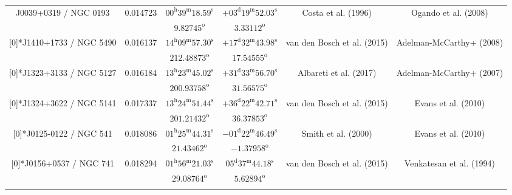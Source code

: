 \begin{landscape}
\begin{longtable}{cccccc}
 \multirow{2}[0]{*}{J0039+0319 / NGC 0193} & \multirow{2}[0]{*}{0.014723} &  
    $00^\text{h}39^\text{m}18.59^\text{s}$  & $+03^\text{d}19^\text{m}52.03^\text{s}$  & 
    \multirow{2}[0]{*}{Costa et al. (1996)\cite{CoordRef72_1996}}& \multirow{2}[0]{*}{Ogando et al. (2008) \cite{RedRef35_2008}} \\*
    & & $9.82745^\text{o}$ & $3.33112^\text{o}$ & & \\ \addlinespace 
 \multirow{2}[0]{*}{J1410+1733 / NGC 5490} & \multirow{2}[0]{*}{0.016137} &  
    $14^\text{h}09^\text{m}57.30^\text{s}$  & $+17^\text{d}32^\text{m}43.98^\text{s}$  & 
    \multirow{2}[0]{*}{van den Bosch et al. (2015)\cite{RedRef90_2015}}& \multirow{2}[0]{*}{Adelman-McCarthy+ (2008) \cite{CoordRef28_2008}} \\*
    & & $212.48873^\text{o}$ & $17.54555^\text{o}$ & & \\ \addlinespace 
 \multirow{2}[0]{*}{J1323+3133 / NGC 5127} & \multirow{2}[0]{*}{0.016184} &  
    $13^\text{h}23^\text{m}45.02^\text{s}$  & $+31^\text{d}33^\text{m}56.70^\text{s}$  & 
     \multirow{2}[0]{*}{Albareti et al. (2017)\cite{RedRef9_2017}}& \multirow{2}[0]{*}{Adelman-McCarthy+ (2007) \cite{CoordRef91_2007}} \\*
    & & $200.93758^\text{o}$ & $31.56575^\text{o}$ & & \\ \addlinespace 
  \multirow{2}[0]{*}{J1324+3622 / NGC 5141} & \multirow{2}[0]{*}{0.017337} &  
    $13^\text{h}24^\text{m}51.44^\text{s}$  & $+36^\text{d}22^\text{m}42.71^\text{s}$  & 
    \multirow{2}[0]{*}{van den Bosch et al. (2015)\cite{RedRef90_2015}}& \multirow{2}[0]{*}{Evans et al. (2010) \cite{CoordRef1_2010}} \\*
    & & $201.21432^\text{o}$ & $36.37853^\text{o}$ & & \\ \addlinespace 
  \multirow{2}[0]{*}{J0125-0122 / NGC 541} & \multirow{2}[0]{*}{0.018086} &  
    $01^\text{h}25^\text{m}44.31^\text{s}$  & $-01^\text{d}22^\text{m}46.49^\text{s}$  & 
    \multirow{2}[0]{*}{Smith et al. (2000)\cite{RedRef52_2000}}& \multirow{2}[0]{*}{Evans et al. (2010) \cite{CoordRef1_2010}} \\*
     & & $21.43462^\text{o}$ & $-1.37958^\text{o}$ & & \\ \addlinespace 

  \multirow{2}[0]{*}{J0156+0537 / NGC 741} & \multirow{2}[0]{*}{0.018294} &  
    $01^\text{h}56^\text{m}21.03^\text{s}$  & $05^\text{d}37^\text{m}44.18^\text{s}$  & 
    \multirow{2}[0]{*}{van den Bosch et al. (2015)\cite{RedRef90_2015}}& \multirow{2}[0]{*}{Venkatesan et al. (1994) \cite{CoordRef94_1994}} \\*
    & & $29.08764^\text{o}$ & $5.62894^\text{o}$ & & \\ \addlinespace 


\end{longtable}
\end{landscape}
